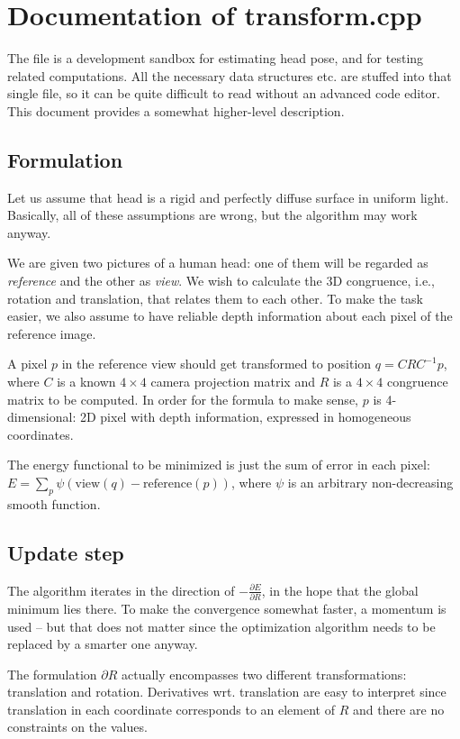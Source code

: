 \documentclass[12pt]{article}
\begin{document}
\section*{Documentation of transform.cpp}

The file is a development sandbox for estimating head pose, and for testing related computations.
All the necessary data structures etc. are stuffed into that single file, so it can be quite difficult to read without an advanced code editor.
This document provides a somewhat higher-level description.

\subsection*{Formulation}

Let us assume that head is a rigid and perfectly diffuse surface in uniform light.
Basically, all of these assumptions are wrong, but the algorithm may work anyway.

We are given two pictures of a human head: one of them will be regarded as {\it reference} and the other as {\it view}. 
We wish to calculate the 3D congruence, i.e., rotation and translation, that relates them to each other.
To make the task easier, we also assume to have reliable depth information about each pixel of the reference image.

A pixel $p$ in the reference view should get transformed to position $q = CRC^{-1}p$, where $C$ is a known $4 \times 4$ camera projection matrix and $R$ is a $4 \times 4$ congruence matrix to be computed.
In order for the formula to make sense, $p$ is 4-dimensional: 2D pixel with depth information, expressed in homogeneous coordinates.

The energy functional to be minimized is just the sum of error in each pixel: $E = \sum_p \psi(\mathrm{view}(q) - \mathrm{reference}(p))$, where $\psi$ is an arbitrary non-decreasing smooth function.

\subsection*{Update step}

The algorithm iterates in the direction of $-\frac {\partial E} {\partial R}$, in the hope that the global minimum lies there.
To make the convergence somewhat faster, a momentum is used -- but that does not matter since the optimization algorithm needs to be replaced by a smarter one anyway.

The formulation $\partial R$ actually encompasses two different transformations: translation and rotation.
Derivatives wrt. translation are easy to interpret since translation in each coordinate corresponds to an element of $R$ and there are no constraints on the values.
\end{document}
